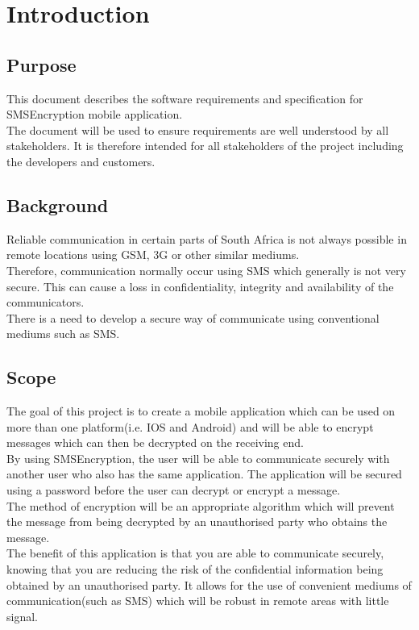 \section{Introduction}

\subsection{Purpose}%
This document describes the software requirements and specification for SMSEncryption mobile application.
\vspace{10pt}\\
The document will be used to ensure requirements are well understood by all stakeholders. It is therefore intended for all stakeholders of the project including the developers and customers.


\subsection{Background}
Reliable communication in certain parts of South Africa is not always possible in remote locations using GSM, 3G or other similar mediums.
\vspace{10pt}\\
Therefore, communication normally occur using SMS which generally is not very secure. This can cause a loss in confidentiality, integrity and availability of the communicators.
\vspace{10pt}\\
There is a need to develop a secure way of communicate using conventional mediums such as SMS.

\subsection{Scope}
The goal of this project is to create a mobile application which can be used on more than one platform(i.e. IOS and Android) and will be able to encrypt messages which can then be decrypted on the receiving end.
\vspace{10pt}\\
By using SMSEncryption, the user will be able to communicate securely with another user who also has the same application. The application will be secured using a password before the user can decrypt or encrypt a message.
\vspace{10pt}\\
The method of encryption will be an appropriate algorithm which will prevent the message from being decrypted by an unauthorised party who obtains the message.
\vspace{10pt}\\
The benefit of this application is that you are able to communicate securely, knowing that you are reducing the risk of the confidential information being obtained by an unauthorised party. It allows for the use of convenient mediums of communication(such as SMS) which will be robust in remote areas with little signal.


